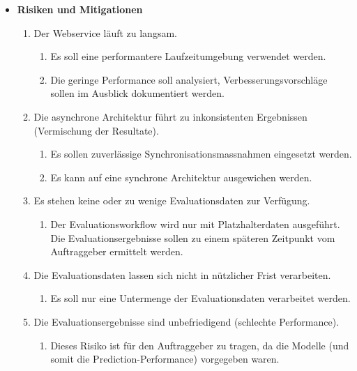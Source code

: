 \begin{itemize}
\begin{enumerate}
        \end{enumerate}
    \item \textbf{Risiken und Mitigationen}
        \begin{enumerate}
            \item Der Webservice läuft zu langsam.
                \begin{enumerate}
                    \item Es soll eine performantere Laufzeitumgebung verwendet werden.
                    \item Die geringe Performance soll analysiert, Verbesserungsvorschläge sollen im Ausblick dokumentiert werden.
                \end{enumerate}
            \item Die asynchrone Architektur führt zu inkonsistenten Ergebnissen (Vermischung der Resultate).
                \begin{enumerate}
                    \item Es sollen zuverlässige Synchronisationsmassnahmen eingesetzt werden.
                    \item Es kann auf eine synchrone Architektur ausgewichen werden.
                \end{enumerate}
            \item Es stehen keine oder zu wenige Evaluationsdaten zur Verfügung.
                \begin{enumerate}
                    \item Der Evaluationsworkflow wird nur mit Platzhalterdaten ausgeführt. Die Evaluationsergebnisse sollen zu einem späteren Zeitpunkt vom Auftraggeber ermittelt werden.
                \end{enumerate}
            \item Die Evaluationsdaten lassen sich nicht in nützlicher Frist verarbeiten.
                \begin{enumerate}
                    \item Es soll nur eine Untermenge der Evaluationsdaten verarbeitet werden.
                \end{enumerate}
            \item Die Evaluationsergebnisse sind unbefriedigend (schlechte Performance).
                \begin{enumerate}
                    \item Dieses Risiko ist für den Auftraggeber zu tragen, da die Modelle (und somit die Prediction-Performance) vorgegeben waren.
                \end{enumerate}
        \end{enumerate}
\end{itemize}


